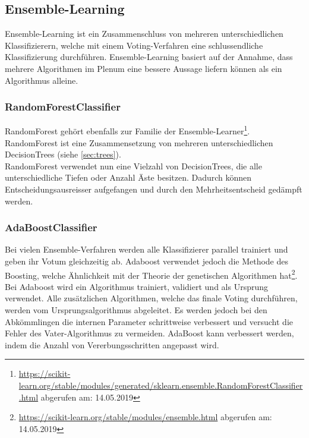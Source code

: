 \subsection{Ensemble-Learning}
Ensemble-Learning ist ein Zusammenschluss von mehreren unterschiedlichen Klassifizierern, welche mit einem Voting-Verfahren eine schlussendliche Klassifizierung durchführen.
Ensemble-Learning basiert auf der Annahme, dass mehrere Algorithmen im Plenum eine bessere Aussage liefern können als ein Algorithmus alleine. \cite{freund1999short}
\subsubsection{RandomForestClassifier}
RandomForest gehört ebenfalls zur Familie der Ensemble-Learner\footnote{\url{https://scikit-learn.org/stable/modules/generated/sklearn.ensemble.RandomForestClassifier.html} abgerufen am: 14.05.2019}.
RandomForest ist eine Zusammensetzung von mehreren unterschiedlichen DecisionTrees (siehe \cref{sec:trees}).\\
RandomForest verwendet nun eine Vielzahl von DecisionTrees, die alle unterschiedliche Tiefen oder Anzahl Äste besitzen.
Dadurch können Entscheidungsausreisser aufgefangen und durch den Mehrheitsentscheid gedämpft werden. \cite{liaw2002classification}
\subsubsection{AdaBoostClassifier}
Bei vielen Ensemble-Verfahren werden alle Klassifizierer parallel trainiert und geben ihr Votum gleichzeitig ab.
Adaboost verwendet jedoch die Methode des \glqq Boosting\grqq{}, welche Ähnlichkeit mit der Theorie der genetischen Algorithmen hat\footnote{\url{https://scikit-learn.org/stable/modules/ensemble.html} abgerufen am: 14.05.2019}.
Bei Adaboost wird ein Algorithmus trainiert, validiert und als Ursprung verwendet. Alle zusätzlichen Algorithmen, welche das finale Voting durchführen, werden vom Ursprungsalgorithmus abgeleitet.
Es werden jedoch bei den Abkömmlingen die internen Parameter schrittweise verbessert und versucht die Fehler des \glqq Vater-Algorithmus\grqq{} zu vermeiden.
AdaBoost kann verbessert werden, indem die Anzahl von Vererbungsschritten angepasst wird. \cite{freund1999short}
